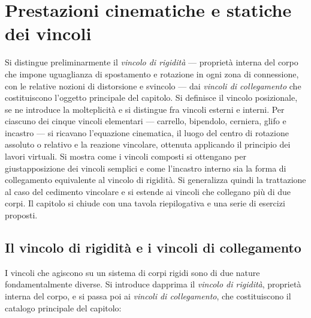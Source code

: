 \graphicspath{{Parti/P03-Meccanica_SR/C04-Vincoli/Figure/}}
\chapter{Prestazioni cinematiche e statiche dei vincoli}\label{cap:vincoli_CR}


\begin{sommario}
	Si distingue preliminarmente il \emph{vincolo di
		rigidità} --- proprietà interna del corpo che impone uguaglianza di spostamento e rotazione in ogni zona di connessione,
	con le relative nozioni di distorsione e svincolo ---	dai \emph{vincoli di collegamento} che costituiscono	l'oggetto principale del capitolo. Si definisce il	vincolo posizionale, se ne introduce la molteplicità	e si distingue fra vincoli esterni e interni. Per
	ciascuno dei cinque vincoli elementari --- carrello,	bipendolo, cerniera, glifo e incastro --- si ricavano	l'equazione cinematica, il luogo del centro di	rotazione assoluto o relativo e la reazione vincolare,	ottenuta applicando il principio dei lavori virtuali.	Si mostra come i vincoli composti si ottengano per	giustapposizione dei vincoli semplici e come l'incastro	interno sia la forma di collegamento equivalente al	vincolo di rigidità. Si generalizza quindi la	trattazione al caso del cedimento vincolare e si	estende ai vincoli che collegano più di due corpi.	Il capitolo si chiude con una tavola riepilogativa	e una serie di esercizi proposti.
\end{sommario}


\section{Il vincolo di rigidità e i vincoli di collegamento}
\label{sec:vincoli_intro}

I vincoli che agiscono su un sistema di corpi rigidi
sono di due nature fondamentalmente diverse. Si
introduce dapprima il \emph{vincolo di rigidità},
proprietà interna del corpo, e si passa poi ai
\emph{vincoli di collegamento}, che costituiscono
il catalogo principale del capitolo:

